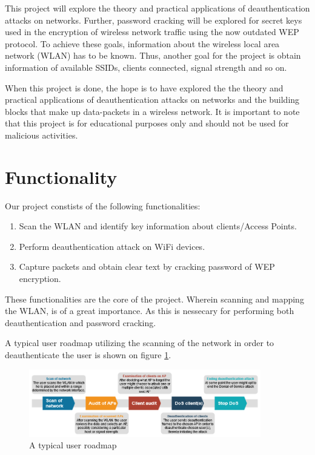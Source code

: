 This project will explore the theory and practical applications of deauthentication attacks on networks. Further, password cracking will be explored for secret keys used in the encryption of wireless network traffic using the now outdated WEP protocol. To achieve these goals, information about the wireless local area network (WLAN) has to be known. Thus, another goal for the project is obtain information of available SSIDs, clients connected, signal strength and so on.

When this project is done, the hope is to have explored the the theory and practical applications of deauthentication attacks on networks and the building blocks that make up data-packets in a wireless network. It is important to note that this project is for educational purposes only and should not be used for malicious activities.

\section{Functionality}
Our project constists of the following functionalities:
\begin{enumerate}
    \item Scan the WLAN and identify key information about clients/Access Points.
    \item Perform deauthentication attack on WiFi devices.
    \item Capture packets and obtain clear text by cracking password of WEP encryption.
\end{enumerate}

These functionalities are the core of the project. Wherein scanning and mapping the WLAN, is of a great importance. As this is nessecary for performing both deauthentication and password cracking. 

A typical user roadmap utilizing the scanning of the network in order to deauthenticate the user is shown on figure \ref{user-roadmap}.

\begin{figure}[!htbp]
    \centering
    \includegraphics[width=0.9\textwidth]{Latex-Files/Billeder/Flowcharts/user-roadmap.png}
    \caption{A typical user roadmap}
    \label{user-roadmap}
\end{figure}


